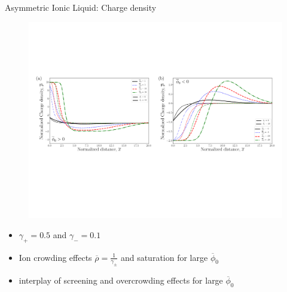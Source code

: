 \documentclass{beamer}
\begin{document}
\begin{frame}{Asymmetric Ionic Liquid: Charge density}
     \begin{figure}[!h]
        \begin{center}
        \includegraphics[scale=0.35]{Figure_7.pdf}
        \end{center}
\end{figure}
\begin{itemize}
    \item $\gamma_+ = 0.5$ and $\gamma_- = 0.1$
    \item Ion crowding effects $\overline{\rho} = \frac{1}{\gamma_\pm}$ and saturation for large $\overline{\phi}_0$
    \item interplay of screening and overcrowding effects for large $\overline{\phi}_0$
\end{itemize}{}
\end{frame}{}
\end{document}
